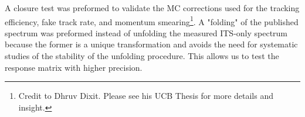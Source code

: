 A closure test was preformed to validate the MC corrections used for the tracking efficiency, fake track rate, and momentum smearing\footnote{Credit to Dhruv Dixit. Please see his UCB Thesis for more details and insight.}. A "folding" of the published spectrum was preformed instead of unfolding the measured ITS-only spectrum because the former is a unique transformation and avoids the need for systematic studies of the stability of the unfolding procedure. This allows us to test the response matrix with higher precision.






